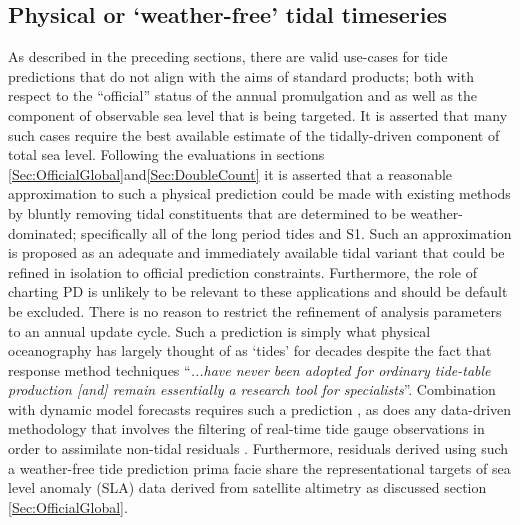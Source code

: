 \subsection{Physical or `weather-free' tidal timeseries}   
\label{Sec:flavour2}
As described in the preceding sections, there are valid use-cases for tide predictions that do not align with the aims of standard products;  both with respect to the ``official'' status of the annual promulgation and as well as the component of observable sea level that is being targeted.  It is asserted that many such cases require the best available estimate of the tidally-driven component of total sea level.  
Following the evaluations in sections \ref{Sec:OfficialGlobal}and\ref{Sec:DoubleCount} it is asserted that a reasonable approximation to such a physical prediction could be made with existing methods by bluntly removing tidal constituents that are determined to be weather-dominated; specifically all of the long period tides and S1.   Such an approximation is proposed as an adequate and immediately available tidal variant that could be refined in isolation to official prediction constraints. Furthermore, the role of charting PD is unlikely to be relevant to these applications and should be default be excluded.
There is no reason to restrict the refinement of analysis parameters to an annual update cycle.
Such a prediction is simply what physical oceanography has largely thought of as `tides' for decades \citep{Munk:1966ts} despite the fact that response method techniques ``\textit{...have never been adopted for ordinary tide-table production [and] remain essentially a research tool for specialists}''\citep[p.198]{Cartwright:2000tt}.
Combination with dynamic model forecasts requires such a prediction \citep{Taylor:2017coa}, as does any data-driven methodology that involves the filtering of real-time tide gauge observations in order to assimilate non-tidal residuals \citep{10.3389/fmars.2019.00437}. Furthermore, residuals derived using such a weather-free tide prediction prima facie share the representational targets of sea level anomaly (SLA) data derived from satellite altimetry as discussed section \ref{Sec:OfficialGlobal}.
      

